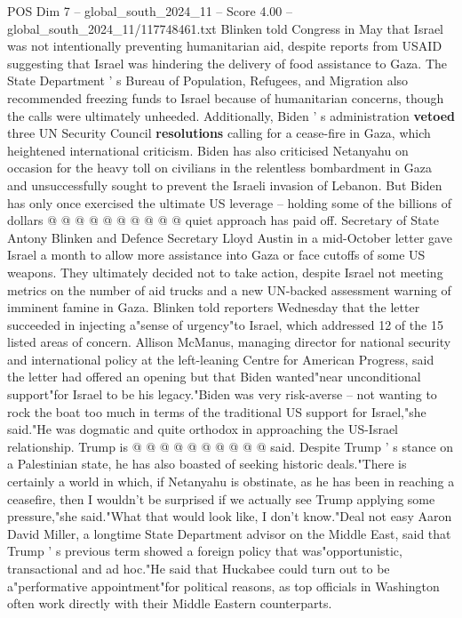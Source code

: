 \begin{textsample}{POS Dim 7 – global\_south\_2024\_11 – Score 4.00 – global\_south\_2024\_11/117748461.txt}
Blinken told Congress in May that Israel was not intentionally preventing humanitarian aid, despite reports from USAID suggesting that Israel was hindering the delivery of food assistance to Gaza.
The State Department ' s Bureau of Population, Refugees, and Migration also recommended freezing funds to Israel because of humanitarian concerns, though the calls were ultimately unheeded.
Additionally, Biden ' s administration \textbf{vetoed} three UN Security Council \textbf{resolutions} calling for a cease-fire in Gaza, which heightened international criticism.
Biden has also criticised Netanyahu on occasion for the heavy toll on civilians in the relentless bombardment in Gaza and unsuccessfully sought to prevent the Israeli invasion of Lebanon.
But Biden has only once exercised the ultimate US leverage -- holding some of the billions of dollars @ @ @ @ @ @ @ @ @ @ quiet approach has paid off.
Secretary of State Antony Blinken and Defence Secretary Lloyd Austin in a mid-October letter gave Israel a month to allow more assistance into Gaza or face cutoffs of some US weapons.
They ultimately decided not to take action, despite Israel not meeting metrics on the number of aid trucks and a new UN-backed assessment warning of imminent famine in Gaza.
Blinken told reporters Wednesday that the letter succeeded in injecting a"sense of urgency"to Israel, which addressed 12 of the 15 listed areas of concern.
Allison McManus, managing director for national security and international policy at the left-leaning Centre for American Progress, said the letter had offered an opening but that Biden wanted"near unconditional support"for Israel to be his legacy."Biden was very risk-averse -- not wanting to rock the boat too much in terms of the traditional US support for Israel,"she said."He was dogmatic and quite orthodox in approaching the US-Israel relationship.
Trump is @ @ @ @ @ @ @ @ @ @ said.
Despite Trump ' s stance on a Palestinian state, he has also boasted of seeking historic deals."There is certainly a world in which, if Netanyahu is obstinate, as he has been in reaching a ceasefire, then I wouldn't be surprised if we actually see Trump applying some pressure,"she said."What that would look like, I don't know."Deal not easy Aaron David Miller, a longtime State Department advisor on the Middle East, said that Trump ' s previous term showed a foreign policy that was"opportunistic, transactional and ad hoc."He said that Huckabee could turn out to be a"performative appointment"for political reasons, as top officials in Washington often work directly with their Middle Eastern counterparts.

\end{textsample}
